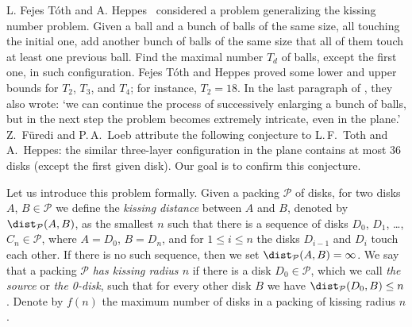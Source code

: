 L. Fejes T\'{o}th and A. Heppes~\cite{toth_heppes} considered a problem generalizing the kissing number problem. Given a ball and a bunch of balls of the same size, all touching the initial one, add another bunch of balls of the same size that all of them touch at least one previous ball. Find the maximal number $T_d$ of balls, except the first one, in such configuration. Fejes T\'{o}th and Heppes proved some lower and upper bounds for $T_2$, $T_3$, and $T_4$; for instance, $T_2 = 18$. In the last paragraph of \cite{toth_heppes}, they also wrote: `we can continue the process of
successively enlarging a bunch of balls, but in the next step the problem becomes extremely intricate, even in the plane.' %
Z.~F\"{u}redi and P.\,A.~Loeb attribute the following conjecture to L.\,F.~Toth and A.~Heppes: the similar three-layer configuration in the plane contains at most $36$ disks (except the first given disk). Our goal is to confirm this conjecture.

Let us introduce this problem formally. Given a packing $\mathcal{P}$ of disks, for two disks $A$, $B\in\mathcal{P}$ we define the \emph{kissing distance} between $A$ and $B$, denoted by $\dist_{\mathcal{P}}(A, B)$, as the smallest $n$ such that there is a sequence of disks $D_0$, $D_1$, \ldots, $C_n\in\mathcal{P}$, where $A = D_0$, $B = D_n$, and for $1\leq i\leq n$ the disks $D_{i-1}$ and $D_i$ touch each other. If there is no such sequence, then we set $\dist_{\mathcal{P}}(A, B) = \infty$. We say that a packing $\mathcal{P}$ \emph{has kissing radius $n$} if there is a disk $D_0\in\mathcal{P}$, which we call \emph{the source} or \emph{the 0-disk}, such that for every other disk $B$ we have $\dist_{\mathcal{P}}(D_0, B)\leq n$. Denote by $f(n)$ the maximum number of disks in a packing of kissing radius $n$.


